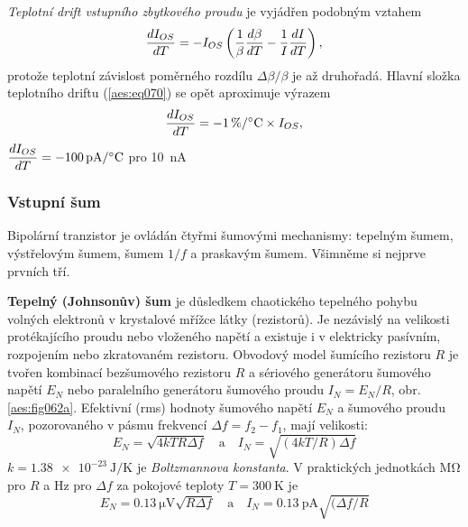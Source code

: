         \emph{Teplotní drift vstupního zbytkového proudu} je vyjádřen podobným vztahem
        \begin{equation}\label{aes:eq070}
          \dfrac{d I_{OS}}{d T} = 
            -I_{OS}\left(\dfrac{1}{\beta}\dfrac{d \beta}{d T} - \dfrac{1}{I}\dfrac{d I}{d T}\right),
        \end{equation}
        protože teplotní závislost poměrného rozdílu \(\Delta\beta/\beta\) je až druhořadá. Hlavní
        složka teplotního driftu (\ref{aes:eq070}) se opět aproximuje výrazem
        \begin{equation}\label{aes:eq071}
          \der{I_{OS}}{T} = \SI[per-mode=symbol]{-1}{\percent\per\degreeCelsius}\times I_{OS},
        \end{equation}
        \(\der{I_{OS}}{T} =\SI[per-mode=symbol]{-100}{\pA\per\degreeCelsius}\) pro \SI{10}{\nA}
     
      \subsubsection{Vstupní šum}\label{aesIchIIIsecIIIssecX}  
        Bipolární tranzistor je ovládán čtyřmi šumovými mechanismy: tepelným šumem, výstřelovým
        šumem, šumem \(1/f\) a praskavým šumem. Všimněme si nejprve prvních tří.

        \textbf{Tepelný (Johnsonův) šum} je důsledkem chaotického tepelného pohybu volných elektronů
        v krystalové mřížce látky (rezistorů). Je nezávislý na velikosti protékajícího proudu nebo
        vloženého napětí a existuje i v elektricky pasívním, rozpojením nebo zkratovaném rezistoru.
        Obvodový model šumícího rezistoru \(R\) je tvořen kombinací bezšumového rezistoru \(R\) a
        sériového generátoru šumového napětí \(E_N\) nebo paralelního generátoru šumového proudu
        \(I_N = E_N/R\), obr. \ref{aes:fig062a}. Efektivní (rms) hodnoty šumového napětí \(E_N\) a
        šumového proudu \(I_N\), pozorovaného v pásmu frekvencí \(\Delta f =  f_2 - f_1\), mají
        velikosti:
        \begin{equation}\label{aes:eq072}
          E_N = \sqrt{4kTR\Delta f} \quad\text{a}\quad I_N = \sqrt{(4kT/R)\Delta f}
        \end{equation}
        \(k = \SI{1.38e-23 }{\joule\per\kelvin}\) je \emph{Boltzmannova konstanta}. V praktických
        jednotkách \si{\mega\ohm} pro \(R\) a \si{\Hz} pro \(\Delta f\) za pokojové teploty \(T=
        \SI{300}{\kelvin}\) je
        \begin{equation}\label{aes:eq073}
          E_N = \SI{0.13}{\uV}\sqrt{R\Delta f} \quad\text{a}\quad 
          I_N = \SI{0.13}{\pA}\sqrt{(\Delta f/R}
        \end{equation}

